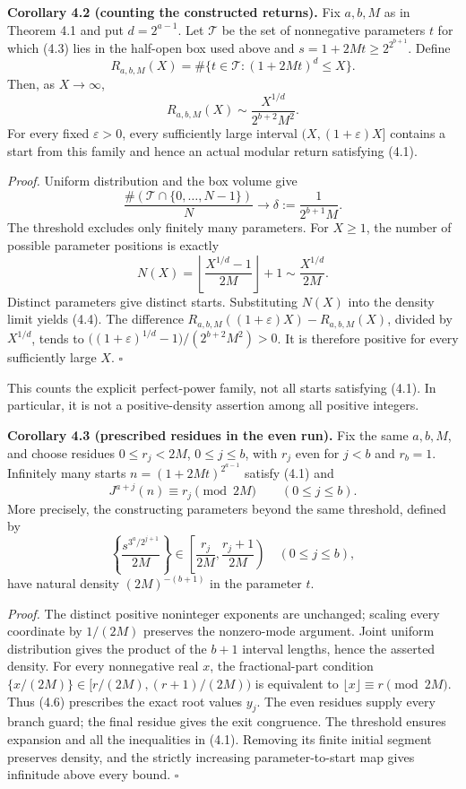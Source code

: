 \documentclass[11pt,a4paper]{article}
\begin{document}
\textbf{Corollary 4.2 (counting the constructed returns).} Fix \(a,b,M\)
as in Theorem 4.1 and put \(d=2^{a-1}\). Let \(\mathcal T\) be the set
of nonnegative parameters \(t\) for which (4.3) lies in the half-open
box used above and \(s=1+2Mt\ge2^{2^{b+1}}\). Define \[
R_{a,b,M}(X)=\#\{t\in\mathcal T:(1+2Mt)^d\le X\}.
\] Then, as \(X\to\infty\), \[
R_{a,b,M}(X)\sim\frac{X^{1/d}}{2^{b+2}M^2}.
\tag{4.4}
\] For every fixed \(\varepsilon>0\), every sufficiently large interval
\((X,(1+\varepsilon)X]\) contains a start from this family and hence an
actual modular return satisfying (4.1).

\emph{Proof.} Uniform distribution and the box volume give \[
\frac{\#(\mathcal T\cap\{0,\ldots,N-1\})}{N}
\longrightarrow\delta:=\frac1{2^{b+1}M}.
\] The threshold excludes only finitely many parameters. For \(X\ge1\),
the number of possible parameter positions is exactly \[
N(X)=\left\lfloor\frac{X^{1/d}-1}{2M}\right\rfloor+1
\sim\frac{X^{1/d}}{2M}.
\] Distinct parameters give distinct starts. Substituting \(N(X)\) into
the density limit yields (4.4). The difference
\(R_{a,b,M}((1+\varepsilon)X)-R_{a,b,M}(X)\), divided by \(X^{1/d}\),
tends to \(\bigl((1+\varepsilon)^{1/d}-1\bigr)/(2^{b+2}M^2)>0\). It is
therefore positive for every sufficiently large \(X\). \(\square\)

This counts the explicit perfect-power family, not all starts satisfying
(4.1). In particular, it is not a positive-density assertion among all
positive integers.

\textbf{Corollary 4.3 (prescribed residues in the even run).} Fix the
same \(a,b,M\), and choose residues \(0\le r_j<2M\), \(0\le j\le b\),
with \(r_j\) even for \(j<b\) and \(r_b=1\). Infinitely many starts
\(n=(1+2Mt)^{2^{a-1}}\) satisfy (4.1) and \[
J^{a+j}(n)\equiv r_j\pmod{2M}\qquad(0\le j\le b).
\tag{4.5}
\] More precisely, the constructing parameters beyond the same
threshold, defined by \[
\left\{\frac{s^{3^a/2^{j+1}}}{2M}\right\}
\in\left[\frac{r_j}{2M},\frac{r_j+1}{2M}\right)
\quad(0\le j\le b),
\tag{4.6}
\] have natural density \((2M)^{-(b+1)}\) in the parameter \(t\).

\emph{Proof.} The distinct positive noninteger exponents are unchanged;
scaling every coordinate by \(1/(2M)\) preserves the nonzero-mode
argument. Joint uniform distribution gives the product of the \(b+1\)
interval lengths, hence the asserted density. For every nonnegative real
\(x\), the fractional-part condition
\(\{x/(2M)\}\in[r/(2M),(r+1)/(2M))\) is equivalent to
\(\lfloor x\rfloor\equiv r\pmod{2M}\). Thus (4.6) prescribes the exact
root values \(y_j\). The even residues supply every branch guard; the
final residue gives the exit congruence. The threshold ensures expansion
and all the inequalities in (4.1). Removing its finite initial segment
preserves density, and the strictly increasing parameter-to-start map
gives infinitude above every bound. \(\square\)
\end{document}
